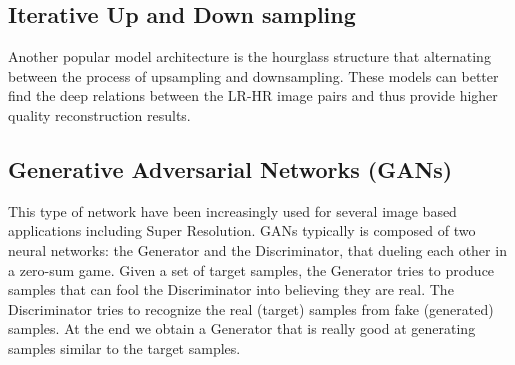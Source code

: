 \documentclass[10pt,twocolumn,letterpaper]{article}
\begin{document}
\subsection{Iterative Up and Down sampling}
Another popular model architecture is the hourglass structure that alternating between the process of upsampling and downsampling. These models can better find the deep relations between the LR-HR image pairs and thus provide higher quality reconstruction results.
\subsection{Generative Adversarial Networks (GANs)}
This type of network have been increasingly used for several image based applications including Super Resolution. GANs typically is composed of two neural networks: the Generator and the Discriminator, that dueling each other in a zero-sum game. Given a set of target samples, the Generator tries to produce samples that can fool the Discriminator into believing they are real. The Discriminator tries to recognize the real (target) samples from fake (generated) samples. At the end we obtain a Generator that is really good at generating samples similar to the target samples.
\end{document}
